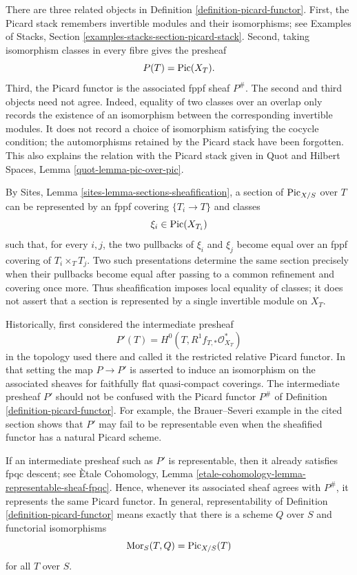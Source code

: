 \begin{remark}
\label{remark-picard-stack-presheaf-sheaf}
There are three related objects in Definition
\ref{definition-picard-functor}. First, the Picard stack remembers
invertible modules and their isomorphisms; see Examples of Stacks,
Section \ref{examples-stacks-section-picard-stack}. Second, taking
isomorphism classes in every fibre gives the presheaf
$$
P(T) = \mathop{\mathrm{Pic}}\nolimits(X_T).
$$
Third, the Picard functor is the associated fppf sheaf $P^\#$.
The second and third objects need not agree. Indeed, equality of two
classes over an overlap only records the existence of an isomorphism
between the corresponding invertible modules. It does not record a choice
of isomorphism satisfying the cocycle condition; the automorphisms retained
by the Picard stack have been forgotten. This also explains the relation
with the Picard stack given in Quot and Hilbert Spaces, Lemma
\ref{quot-lemma-pic-over-pic}.

By Sites, Lemma \ref{sites-lemma-sections-sheafification}, a section of
$\mathrm{Pic}_{X/S}$ over $T$ can be represented by an fppf covering
$\{T_i \to T\}$ and classes
$$
\xi_i \in \mathop{\mathrm{Pic}}\nolimits(X_{T_i})
$$
such that, for every $i,j$, the two pullbacks of $\xi_i$ and $\xi_j$
become equal over an fppf covering of $T_i \times_T T_j$. Two such
presentations determine the same section precisely when their pullbacks
become equal after passing to a common refinement and covering once more.
Thus sheafification imposes local equality of classes; it does not assert
that a section is represented by a single invertible module on $X_T$.

Historically, \cite[Expos\'e 232, Section 1]{FGA} first considered the
intermediate presheaf
$$
P'(T) = H^0(T, R^1f_{T, *}\mathcal{O}_{X_T}^*)
$$
in the topology used there and called it the restricted relative Picard
functor. In that setting the map $P \to P'$ is asserted to induce an
isomorphism on the associated sheaves for faithfully flat quasi-compact
coverings. The intermediate presheaf $P'$ should not be confused with the
Picard functor $P^\#$ of Definition \ref{definition-picard-functor}.
For example, the Brauer--Severi example in the cited section shows that
$P'$ may fail to be representable even when the sheafified functor has a
natural Picard scheme.

If an intermediate presheaf such as $P'$ is representable, then it already
satisfies fpqc descent; see \`Etale Cohomology, Lemma
\ref{etale-cohomology-lemma-representable-sheaf-fpqc}. Hence, whenever its
associated sheaf agrees with $P^\#$, it represents the same Picard functor.
In general, representability of Definition \ref{definition-picard-functor}
means exactly that there is a scheme $Q$ over $S$ and functorial
isomorphisms
$$
\mathop{\mathrm{Mor}}\nolimits_S(T, Q) = \mathrm{Pic}_{X/S}(T)
$$
for all $T$ over $S$.
\end{remark}


